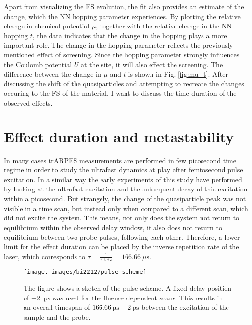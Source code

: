 Apart from visualizing the FS evolution, the fit also provides an estimate of the change, which the NN hopping parameter experiences.
By plotting the relative change in chemical potential $\mu$, together with the relative change in the NN hopping $t$, the data indicates that the change in the hopping plays a more important role.
The change in the hopping parameter reflects the previously mentioned effect of screening.
Since the hopping parameter strongly influences the Coulomb potential $U$ at the  site, it will also effect the screening.
The difference between the change in $\mu$ and $t$ is shown in Fig. \ref{fig:mu_t}.
After discussing the shift of the quasiparticles and attempting to recreate the changes occuring to the FS of the material, I want to discuss the time duration of the observed effects.

\section{Effect duration and metastability}
\label{sec:meta}

In many cases trARPES measurements are performed in few picosecond time regime in order to study the ultrafast dynamics at play after femtosecond pulse excitation.
In a similar way the early experiments of this study have performed by looking at the ultrafast excitation and the subsequent decay of this excitation within a picosecond.
But strangely, the change of the quasiparticle peak was not visible in a time scan, but instead only when compared to a different scan, which did not excite the system.
This means, not only does the system not return to equilibrium within the observed delay window, it also does not return to equilibrium between two probe pulses, following each other.
Therefore, a lower limit for the effect duration can be placed by the inverse repetition rate of the laser, which corresponds to $\tau=\frac{1}{\qty{6}{\kilo\hertz}}=\qty{166.66}{\mu\second}$.

\begin{figure}
	\centering
	\texttt{[image: images/bi2212/pulse\_scheme]}
	\caption{The figure shows a sketch of the pulse scheme. A fixed delay position of \qty{-2}{\pico\second} was used for the fluence dependent scans. This results in an overall timespan of $\qty{166.66}{\micro\second}-\qty{2}{\pico\second}$ between the excitation of the sample and the probe.}
	\label{fig:pulsescheme}
\end{figure}

